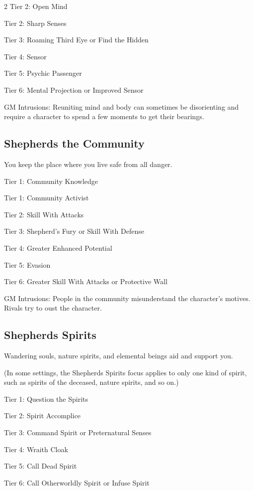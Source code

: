 \begin{multicols}{2}
Tier 2: Open Mind

Tier 2: Sharp Senses

Tier 3: Roaming Third Eye or Find the Hidden

Tier 4: Sensor

Tier 5: Psychic Passenger

Tier 6: Mental Projection or Improved Sensor

GM Intrusions: Reuniting mind and body can sometimes be disorienting and require a character to spend a few moments to get their bearings.

\subsection{Shepherds the Community}

You keep the place where you live safe from all danger.

Tier 1: Community Knowledge

Tier 1: Community Activist

Tier 2: Skill With Attacks

Tier 3: Shepherd’s Fury or Skill With Defense

Tier 4: Greater Enhanced Potential

Tier 5: Evasion

Tier 6: Greater Skill With Attacks or Protective Wall

GM Intrusions: People in the community misunderstand the character’s motives. Rivals try to oust the character.

\subsection{Shepherds Spirits}

Wandering souls, nature spirits, and elemental beings aid and support you.

(In some settings, the Shepherds Spirits focus applies to only one kind of spirit, such as spirits of the deceased, nature spirits, and so on.)

Tier 1: Question the Spirits

Tier 2: Spirit Accomplice

Tier 3: Command Spirit or Preternatural Senses

Tier 4: Wraith Cloak

Tier 5: Call Dead Spirit

Tier 6: Call Otherworldly Spirit or Infuse Spirit


\end{multicols}
